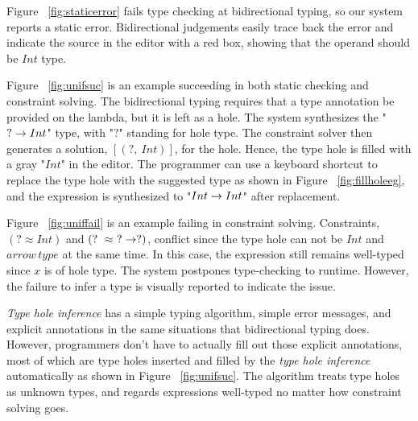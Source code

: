 \par Figure ~\ref{fig:staticerror} fails type checking at bidirectional typing, so our system reports a static error. Bidirectional judgements easily trace back the error and indicate the source in the editor with a red box, showing that the operand should be $Int$ type. \par 
Figure ~\ref{fig:unifsuc} is an example succeeding in both static checking and constraint solving.  The bidirectional typing requires that a type annotation be provided on the lambda, but it is left as a hole. The system synthesizes the "$? \rightarrow Int$" type, with "$?$" standing for hole type. The constraint solver then generates a solution, $[(?,~ Int)]$, for the hole. Hence, the type hole is filled with a gray "$Int$" in the editor. The programmer can use a keyboard shortcut to replace the type hole with the suggested type as shown in Figure ~\ref{fig:fillholeeg}, and the expression is synthesized to "$Int \rightarrow Int$" after replacement. \par

Figure ~\ref{fig:uniffail} is an example failing in constraint solving. Constraints, $(? \approx Int)$ and $(? ~ \approx ~ ? \rightarrow ?)$, conflict since the type hole can not be $Int$ and $arrow \, type$ at the same time. In this case, the expression still remains well-typed since $x$ is of hole type. The system postpones type-checking to runtime. However, the failure to infer a type is visually reported to indicate the issue.

\emph{Type hole inference} has a simple typing algorithm, simple error messages, and explicit annotations in the same situations that bidirectional typing does. However, programmers don't have to actually fill out those explicit annotations, most of which are type holes inserted and filled by the \emph{type hole inference} automatically as shown in Figure ~\ref{fig:unifsuc}. The algorithm treats type holes as unknown types, and regards expressions well-typed no matter how constraint solving goes. 


